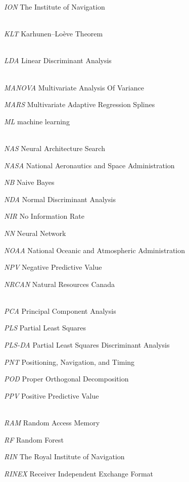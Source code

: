 \let\LaTeXcline\cline\documentclass[sn-mathphys-num]{sn-jnl}\let\cline\LaTeXcline
\begin{document}
\textit{ION} The Institute of Navigation


\\[2\baselineskip]

\textit{KLT} Karhunen–Loève Theorem


\\[2\baselineskip]

\textit{LDA} Linear Discriminant Analysis


\\[2\baselineskip]

\textit{MANOVA} Multivariate Analysis Of Variance

\textit{MARS} Multivariate Adaptive Regression Splines

\textit{ML} machine learning


\\[2\baselineskip]

\textit{NAS} Neural Architecture Search

\textit{NASA} National Aeronautics and Space Administration

\textit{NB} Naive Bayes

\textit{NDA} Normal Discriminant Analysis

\textit{NIR} No Information Rate

\textit{NN} Neural Network

\textit{NOAA} National Oceanic and Atmospheric Administration

\textit{NPV} Negative Predictive Value

\textit{NRCAN} Natural Resources Canada


\\[2\baselineskip]

\textit{PCA} Principal Component Analysis

\textit{PLS} Partial Least Squares

\textit{PLS-DA} Partial Least Squares Discriminant Analysis

\textit{PNT} Positioning, Navigation, and Timing

\textit{POD} Proper Orthogonal Decomposition

\textit{PPV} Positive Predictive Value


\\[2\baselineskip]

\textit{RAM} Random Access Memory

\textit{RF} Random Forest

\textit{RIN} The Royal Institute of Navigation

\textit{RINEX} Receiver Independent Exchange Format
\end{document}
